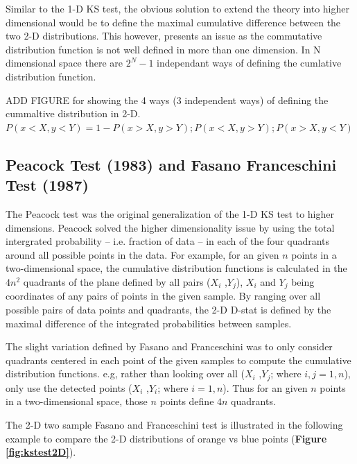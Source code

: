 \documentclass[codesnippet]{jss}
\begin{document}
Similar to the 1-D KS test, the obvious solution to extend the theory into higher dimensional would be to define the maximal cumulative difference between the two 2-D distributions. This however, presents an issue as the commutative distribution function is not well defined in more than one dimension. In N dimensional space there are $2^{N}-1$ independant ways of defining the cumlative distribution function\citep{Peacock1983}.

ADD FIGURE for showing the 4 ways (3 independent ways) of defining the cummaltive distribution in 2-D.
$P(x < X, y < Y) = 1 - P(x > X, y > Y); P(x < X, y > Y); P(x > X, y < Y)$

\subsection{Peacock Test (1983) and Fasano Franceschini Test (1987)}
The Peacock test was the original generalization of the 1-D KS test to higher dimensions. Peacock solved the higher dimensionality issue by using the total intergrated probability -- i.e. fraction of data -- in each of the four quadrants around all possible points in the data. For example, for an given $n$ points in a two-dimensional space, the cumulative distribution functions is calculated in the $4n^2$ quadrants of the plane defined by all pairs ($X_i$ ,$Y_j$), $X_i$ and $Y_j$ being coordinates of any pairs of points in the given sample. By ranging over all possible pairs of data points and quadrants, the 2-D D-stat is defined by the maximal difference of the integrated probabilities between samples.

The slight variation defined by Fasano and Franceschini was to only consider quadrants centered in each point of the given samples to compute the cumulative distribution functions. e.g, rather than looking over all ($X_i$ ,$Y_j$; where $i,j={1,n}$), only use the detected points ($X_i$ ,$Y_i$; where $i={1,n}$). Thus for an given $n$ points in a two-dimensional space, those $n$ points define $4n$ quadrants.

The 2-D two sample Fasano and Franceschini test is illustrated in the following example to compare the 2-D distributions of orange vs blue points (\textbf{Figure \ref{fig:kstest2D}}).
\end{document}
